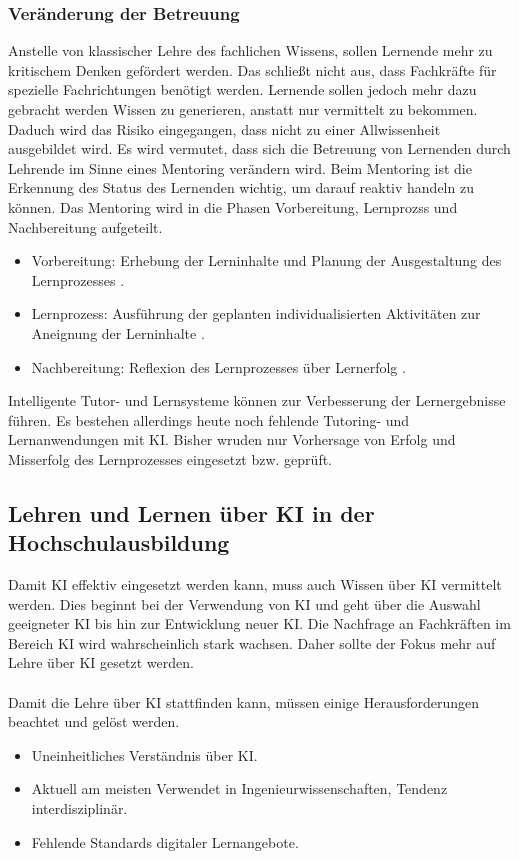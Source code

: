 \subsubsection*{Veränderung der Betreuung}
Anstelle von klassischer Lehre des fachlichen Wissens, sollen Lernende mehr zu kritischem Denken gefördert werden. Das schließt nicht aus, dass Fachkräfte für spezielle Fachrichtungen benötigt werden.
Lernende sollen jedoch mehr dazu gebracht werden Wissen zu generieren, anstatt nur vermittelt zu bekommen.
Daduch wird das Risiko eingegangen, dass nicht zu einer \glqq Allwissenheit\grqq{} ausgebildet wird.
Es wird vermutet, dass sich die Betreuung von Lernenden durch Lehrende im Sinne eines Mentoring verändern wird.
Beim Mentoring ist die Erkennung des Status des Lernenden wichtig, um darauf reaktiv handeln zu können.
Das Mentoring wird in die Phasen Vorbereitung, Lernprozss und Nachbereitung aufgeteilt. \cite*[S. 22f]{Witt.2020}
\begin{itemize}
    \item Vorbereitung: Erhebung der Lerninhalte und Planung der Ausgestaltung des Lernprozesses \cite*[GENAUE SEITE]{Witt.2020}.
    \item Lernprozess: Ausführung der geplanten individualisierten Aktivitäten zur Aneignung der Lerninhalte \cite*[GENAUE SEITE]{Witt.2020}.
    \item Nachbereitung: Reflexion des Lernprozesses über Lernerfolg \cite*[GENAUE SEITE]{Witt.2020}.
\end{itemize}
Intelligente Tutor- und Lernsysteme können zur Verbesserung der Lernergebnisse führen.
Es bestehen allerdings heute noch fehlende Tutoring- und Lernanwendungen mit KI.
Bisher wruden nur Vorhersage von Erfolg und Misserfolg des Lernprozesses eingesetzt bzw. geprüft. \cite*[S. 24]{Witt.2020}

\subsection{Lehren und Lernen über KI in der Hochschulausbildung}
Damit KI effektiv eingesetzt werden kann, muss auch Wissen über KI vermittelt werden.
Dies beginnt bei der Verwendung von KI und geht über die Auswahl geeigneter KI bis hin zur Entwicklung neuer KI.
Die Nachfrage an Fachkräften im Bereich KI wird wahrscheinlich stark wachsen.
Daher sollte der Fokus mehr auf Lehre über KI gesetzt werden. \cite*[S. 26]{Witt.2020}
\\ \noindent
\\ \noindent
Damit die Lehre über KI stattfinden kann, müssen einige Herausforderungen beachtet und gelöst werden.\cite*[S. 27]{Witt.2020}
\begin{itemize}
    \item Uneinheitliches Verständnis über KI. \cite*[S. 27]{Witt.2020}
    \item Aktuell am meisten Verwendet in Ingenieurwissenschaften, Tendenz interdisziplinär. \cite*[S. 27]{Witt.2020}
    \item Fehlende Standards digitaler Lernangebote. \cite*[S. 27]{Witt.2020}
\end{itemize}

